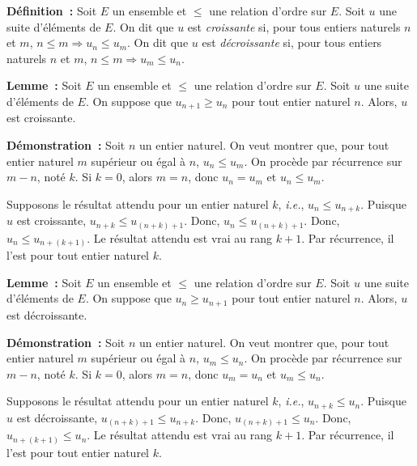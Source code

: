 \noindent\textbf{Définition :}
    Soit $E$ un ensemble et $\leq$ une relation d'ordre sur $E$.
    Soit $u$ une suite d'éléments de $E$. 
    On dit que $u$ est \emph{croissante} si, pour tous entiers naturels $n$ et $m$, $n \leq m \Rightarrow u_n \leq u_m$.
    On dit que $u$ est \emph{décroissante} si, pour tous entiers naturels $n$ et $m$, $n \leq m \Rightarrow u_m \leq u_n$.

\medskip

\noindent\textbf{Lemme :}
    Soit $E$ un ensemble et $\leq$ une relation d'ordre sur $E$.
    Soit $u$ une suite d'éléments de $E$. 
    On suppose que $u_{n+1} \geq u_n$ pour tout entier naturel $n$. 
    Alors, $u$ est croissante. 

\medskip

\noindent\textbf{Démonstration :} Soit $n$ un entier naturel. 
    On veut montrer que, pour tout entier naturel $m$ supérieur ou égal à $n$, $u_n \leq u_m$.
    On procède par récurrence sur $m - n$, noté $k$.
    Si $k = 0$, alors $m = n$, donc $u_n = u_m$ et $u_n \leq u_m$.

    Supposons le résultat attendu pour un entier naturel $k$, \emph{i.e.}, $u_n \leq u_{n+k}$. 
    Puisque $u$ est croissante, $u_{n+k} \leq u_{(n+k)+1}$.
    Donc, $u_n \leq u_{(n+k)+1}$.
    Donc, $u_n \leq u_{n+(k+1)}$.
    Le résultat attendu est vrai au rang $k+1$.
    Par récurrence, il l'est pour tout entier naturel $k$.

    \done

\medskip

\noindent\textbf{Lemme :}
    Soit $E$ un ensemble et $\leq$ une relation d'ordre sur $E$.
    Soit $u$ une suite d'éléments de $E$. 
    On suppose que $u_n \geq u_{n+1}$ pour tout entier naturel $n$. 
    Alors, $u$ est décroissante. 

\medskip

\noindent\textbf{Démonstration :} Soit $n$ un entier naturel. 
    On veut montrer que, pour tout entier naturel $m$ supérieur ou égal à $n$, $u_m \leq u_n$.
    On procède par récurrence sur $m - n$, noté $k$.
    Si $k = 0$, alors $m = n$, donc $u_m = u_n$ et $u_m \leq u_n$.

    Supposons le résultat attendu pour un entier naturel $k$, \emph{i.e.}, $u_{n+k} \leq u_n$. 
    Puisque $u$ est décroissante, $u_{(n+k)+1} \leq u_{n+k}$.
    Donc, $u_{(n+k)+1} \leq u_n$.
    Donc, $u_{n+(k+1)} \leq u_n$.
    Le résultat attendu est vrai au rang $k+1$.
    Par récurrence, il l'est pour tout entier naturel $k$.

